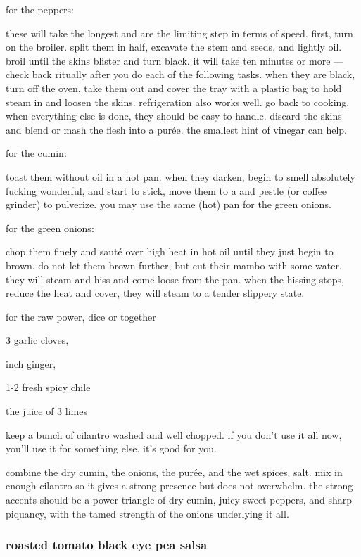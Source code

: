 for the peppers:

these will take the longest and are the limiting step in terms of
speed. first, turn on the broiler. split them in half, excavate the
stem and seeds, and lightly oil. broil until the skins blister and
turn black. it will take ten minutes or more --- check back ritually
after you do each of the following tasks. when they are black, turn
off the oven, take them out and cover the tray with a plastic bag to
hold steam in and loosen the skins. refrigeration also works well. go
back to cooking. when everything else is done, they should be easy to
handle. discard the skins and blend or mash the flesh into a
pur\'{e}e. the smallest hint of vinegar can help.

for the cumin:

toast them without oil in a hot pan. when they darken, begin to smell
absolutely fucking wonderful, and start to stick, move them to a
 and pestle (or coffee grinder) to pulverize. you may use the
same (hot) pan for the green onions.

for the green onions:

chop them finely and saut\'{e} over high heat in hot oil until they
just begin to brown. do not let them brown further, but cut their
mambo with some water. they will steam and hiss and come loose from
the pan. when the hissing stops, reduce the heat and cover, they will
steam to a tender slippery state.

for the raw power, dice or  together

\begin{ingredients}
  \item 3 garlic cloves,
  \item \onehalf inch ginger,
  \item 1-2 fresh spicy chile
  \item the juice of 3 limes
\end{ingredients}

keep a bunch of cilantro washed and well chopped. if you don't use it
all now, you'll use it for something else. it's good for you.

combine the dry cumin, the onions, the pur\'{e}e, and the wet
spices. salt. mix in enough cilantro so it gives a strong presence but
does not overwhelm. the strong accents should be a power triangle of
dry cumin, juicy sweet peppers, and sharp piquancy, with the tamed
strength of the onions underlying it all.

\subsubsection{roasted tomato black eye pea salsa}

